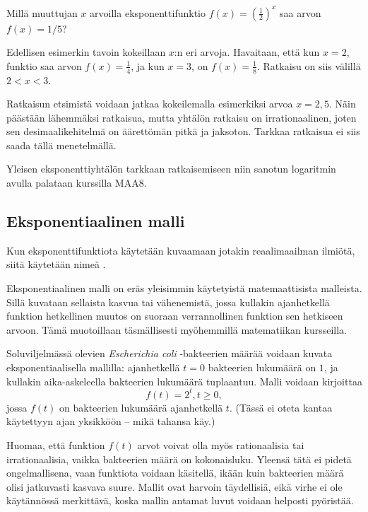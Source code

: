 \begin{esimerkki}
Millä muuttujan $x$ arvoilla eksponenttifunktio $f(x) = \left( \frac{1}{2} \right)^x$ saa arvon $f(x) = 1/5$?

	\begin{esimratk}
Edellisen esimerkin tavoin kokeillaan $x$:n eri arvoja. Havaitaan, että kun $x = 2$, funktio saa arvon $f(x) = \frac{1}{4}$, ja kun $x = 3$, on $f(x) = \frac{1}{8}$. Ratkaisu on siis välillä $2 < x < 3$.

Ratkaisun etsimistä voidaan jatkaa kokeilemalla esimerkiksi arvoa $x = 2,5$. Näin päästään lähemmäksi ratkaisua, mutta yhtälön ratkaisu on irrationaalinen, joten sen desimaalikehitelmä on äärettömän pitkä ja jaksoton. Tarkkaa ratkaisua ei siis saada tällä menetelmällä.
	\end{esimratk}
\end{esimerkki}

Yleisen eksponenttiyhtälön tarkkaan ratkaisemiseen niin sanotun logaritmin avulla palataan kurssilla MAA8. %

\subsection{Eksponentiaalinen malli}

Kun eksponenttifunktiota käytetään kuvaamaan jotakin reaalimaailman ilmiötä, siitä käytetään nimeä .

Eksponentiaalinen malli on eräs yleisimmin käytetyistä matemaattisista malleista. Sillä kuvataan sellaista kasvua tai vähenemistä, jossa kullakin ajanhetkellä funktion hetkellinen muutos on suoraan verrannollinen funktion sen hetkiseen arvoon. Tämä muotoillaan täsmällisesti myöhemmillä matematiikan kursseilla.

\begin{esimerkki}
Soluviljelmässä olevien \textit{Escherichia coli} -bakteerien määrää voidaan kuvata eksponentiaalisella mallilla: ajanhetkellä $t = 0$ bakteerien lukumäärä on $1$, ja kullakin aika-askeleella bakteerien lukumäärä tuplaantuu. Malli voidaan kirjoittaa %
\[
f(t) = 2^t, t \ge 0,
\]
jossa $f(t)$ on bakteerien lukumäärä ajanhetkellä $t$. (Tässä ei oteta kantaa käytettyyn ajan yksikköön -- mikä tahansa käy.)

Huomaa, että funktion $f(t)$ arvot voivat olla myös rationaalisia tai irrationaalisia, vaikka bakteerien määrä on kokonaisluku. Yleensä tätä ei pidetä ongelmallisena, vaan funktiota voidaan käsitellä, ikään kuin bakteerien määrä olisi jatkuvasti kasvava suure. Mallit ovat harvoin täydellisiä, eikä virhe ei ole käytännössä merkittävä, koska mallin antamat luvut voidaan helposti pyöristää.

\begin{center}
	\begin{kuvaajapohja}{0.8}{0}{6}{-1}{9} %
	\end{kuvaajapohja}
\end{center}

\end{esimerkki}


